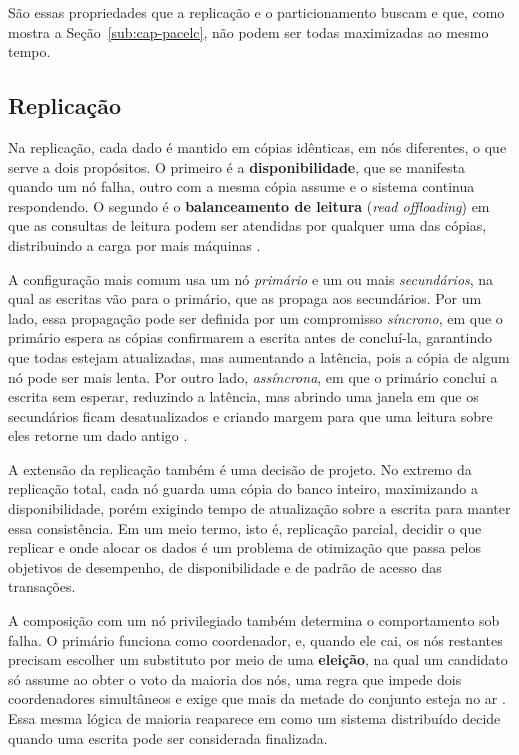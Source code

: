 São essas propriedades que a replicação e o particionamento buscam e que, como mostra a Seção~\ref{sub:cap-pacelc}, não podem ser todas maximizadas ao mesmo tempo.

\subsection{Replicação}
\label{sub:replicacao}

Na replicação, cada dado é mantido em cópias idênticas, em nós diferentes, o que serve a dois propósitos. O primeiro é a \textbf{disponibilidade}, que se manifesta quando um nó falha, outro com a mesma cópia assume e o sistema continua respondendo. O segundo é o \textbf{balanceamento de leitura} (\textit{read offloading}) em que as consultas de leitura podem ser atendidas por qualquer uma das cópias, distribuindo a carga por mais máquinas \citep{cattell2011}.

A configuração mais comum usa um nó \textit{primário} e um ou mais \textit{secundários}, na qual as escritas vão para o primário, que as propaga aos secundários. Por um lado, essa propagação pode ser definida por um compromisso \textit{síncrono}, em que o primário espera as cópias confirmarem a escrita antes de concluí-la, garantindo que todas estejam atualizadas, mas aumentando a latência, pois a cópia de algum nó pode ser mais lenta. Por outro lado, \textit{assíncrona}, em que o primário conclui a escrita sem esperar, reduzindo a latência, mas abrindo uma janela em que os secundários ficam desatualizados e criando margem para que uma leitura sobre eles retorne um dado antigo \citep{abadi2012}.

A extensão da replicação também é uma decisão de projeto. No extremo da replicação total, cada nó guarda uma cópia do banco inteiro, maximizando a disponibilidade, porém exigindo tempo de atualização sobre a escrita para manter essa consistência. Em um meio termo, isto é, replicação parcial, decidir o que replicar e onde alocar os dados é um problema de otimização que passa pelos objetivos de desempenho, de disponibilidade e de padrão de acesso das transações.

A composição com um nó privilegiado também determina o comportamento sob falha. O primário funciona como coordenador, e, quando ele cai, os nós restantes precisam escolher um substituto por meio de uma \textbf{eleição}, na qual um candidato só assume ao obter o voto da maioria dos nós, uma regra que impede dois coordenadores simultâneos e exige que mais da metade do conjunto esteja no ar \citep{elmasri2017}. Essa mesma lógica de maioria reaparece em como um sistema distribuído decide quando uma escrita pode ser considerada finalizada.

